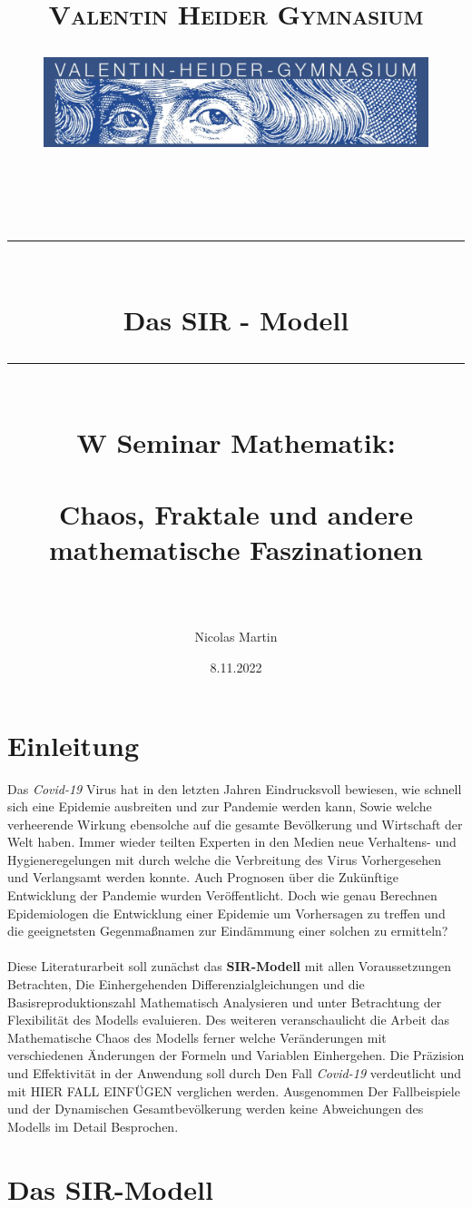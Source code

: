 \documentclass[12pt]{scrartcl} %
\title{	
	\normalfont\normalsize
	\vspace{200pt}
	\textsc{Valentin Heider Gymnasium}\\
	\begin{figure}[h] %
	\centering
	\includegraphics[width=0.5\columnwidth]{VHGLogo.jpg} 
	\end{figure}
	\vspace{25pt}\\
	
	\rule{\linewidth}{0.5pt}\\
	\vspace{20pt}
	{\huge Das SIR - Modell}\\
	\vspace{12pt}
	\rule{\linewidth}{2pt}\\
	\vspace{20pt}
	{\Large W Seminar Mathematik:}\\
	\vspace{12pt}\\
	{\Large Chaos, Fraktale und andere mathematische Faszinationen}\\
	\vspace{15pt}\\
}
\author{\LARGE Nicolas Martin} %
\date{\normalsize 8.11.2022}
\begin{document}

\maketitle %
\newpage

\doublespacing
\tableofcontents
\onehalfspacing
\newpage


\section{Einleitung}

Das \textsl{Covid-19} Virus hat in den letzten Jahren Eindrucksvoll bewiesen, wie schnell sich eine Epidemie ausbreiten und zur Pandemie werden kann,  
Sowie welche verheerende Wirkung ebensolche auf die gesamte Bevölkerung und Wirtschaft der Welt haben. 
Immer wieder teilten Experten in den Medien neue Verhaltens- und Hygieneregelungen mit durch welche die Verbreitung des Virus Vorhergesehen  und Verlangsamt werden konnte. Auch Prognosen über die Zukünftige Entwicklung der Pandemie wurden Veröffentlicht. 
Doch wie genau Berechnen Epidemiologen die Entwicklung einer Epidemie um Vorhersagen zu treffen und die geeignetsten Gegenmaßnamen zur Eindämmung einer solchen zu ermitteln?\\
\\
Diese Literaturarbeit soll zunächst das \textbf{SIR-Modell} mit allen Voraussetzungen Betrachten, Die Einhergehenden Differenzialgleichungen und die Basisreproduktionszahl Mathematisch Analysieren und unter Betrachtung der Flexibilität des Modells evaluieren. 
Des weiteren veranschaulicht die Arbeit das Mathematische Chaos des Modells 
ferner welche Veränderungen mit verschiedenen Änderungen der Formeln und Variablen Einhergehen. 
Die Präzision und Effektivität in der Anwendung soll durch Den Fall \textsl{Covid-19} verdeutlicht und mit  HIER FALL EINFÜGEN verglichen werden. 
Ausgenommen Der Fallbeispiele und der Dynamischen Gesamtbevölkerung werden keine Abweichungen des Modells im Detail Besprochen. 


\newpage
\section{Das SIR-Modell}
\end{document}
